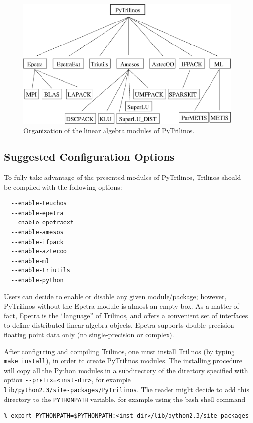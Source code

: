 \documentclass[10pt,relax]{SANDreport}
\newcommand{\PyTrilinos}{{PyTrilinos}}
\begin{document}
\begin{figure}
\begin{center}
\includegraphics[width=12cm]{organization.eps}
\caption{Organization of the linear algebra modules of PyTrilinos.}
\label{fig:organization}
\end{center}
\end{figure}

\subsection{Suggested Configuration Options}

To fully take advantage of the presented modules of \PyTrilinos, Trilinos
should be compiled with the following options:
\begin{verbatim}
  --enable-teuchos    
  --enable-epetra     
  --enable-epetraext  
  --enable-amesos    
  --enable-ifpack     
  --enable-aztecoo     
  --enable-ml         
  --enable-triutils   
  --enable-python
\end{verbatim}

Users can decide to enable or disable any given module/package; however,
PyTrilinos without the Epetra module is almost an empty box.  As a matter of
fact, Epetra is the ``language'' of Trilinos, and offers a convenient set of
interfaces to define distributed linear algebra objects. Epetra supports
double-precision floating point data only (no single-precision or complex). 

\smallskip

After configuring and compiling Trilinos, one must install Trilinos 
(by typing \verb!make install!), in order to create PyTrilinos modules.
The installing procedure will copy all the Python modules in a subdirectory of
the directory specified with option \verb!--prefix=<inst-dir>!, for example \\
\verb!lib/python2.3/site-packages/PyTrilinos!. The reader might decide 
to add this directory to the \verb!PYTHONPATH! variable, for example using the 
bash shell command
\begin{verbatim}
% export PYTHONPATH=$PYTHONPATH:<inst-dir>/lib/python2.3/site-packages
\end{verbatim}
\end{document}
